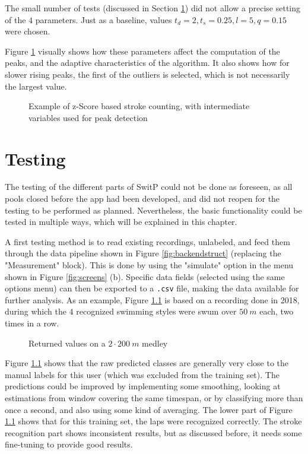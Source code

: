 \documentclass[a4paper, oneside]{discothesis}
\begin{document}
The small number of tests (discussed in Section \ref{test}) did not allow a precise setting of the $4$ parameters. Just as a baseline, values $t_d=2, t_s=0.25 , l=5 , q=0.15$ were chosen.

Figure \ref{fig:strokedetec} visually shows how these parameters affect the computation of the peaks, and the adaptive characteristics of the algorithm. It also shows how for slower rising peaks, the first of the outliers is selected, which is not necessarily the largest value.
\begin{figure}[H]
  \centering
  
  \caption{Example of z-Score based stroke counting, with intermediate variables used for peak detection}
  \label{fig:strokedetec}
\end{figure}

\chapter{Testing}\label{test}
The testing of the different parts of SwitP could not be done as foreseen, as all pools closed before the app had been developed, and did not reopen for the testing to be performed as planned. Nevertheless, the basic functionality could be tested in multiple ways, which will be explained in this chapter.

A first testing method is to read existing recordings, unlabeled, and feed them through the data pipeline shown in Figure \ref{fig:backendstruct} (replacing the "Measurement" block). This is done by using the "simulate" option in the menu shown in Figure \ref{fig:screens} (b).
Specific data fields (selected using the same options menu) can then be exported to a \texttt{.csv} file, making the data available for further analysis. As an example, Figure \ref{fig:test} is based on a recording done in 2018, during which the $4$ recognized swimming styles were swum over $50~m$ each, two times in a row.

\begin{figure}[H]
  \centering
  
  \caption{Returned values on a $2\cdot 200~m$ medley}
  \label{fig:test}
\end{figure}

Figure \ref{fig:test} shows that the raw predicted classes are generally very close to the manual labels for this user (which was excluded from the training set). The predictions could be improved by implementing some smoothing, looking at estimations from window covering the same timespan, or by classifying more than once a second, and also using some kind of averaging. The lower part of Figure \ref{fig:test} shows that for this training set, the laps were recognized correctly. The stroke recognition part shows inconsistent results, but as discussed before, it needs some fine-tuning to provide good results. 
\end{document}
